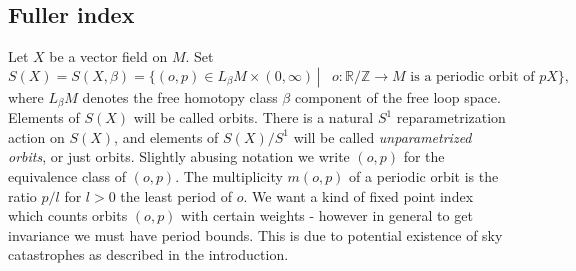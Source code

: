 \documentclass{amsart}
\numberwithin{equation}{section}
\theoremstyle{definition}
\theoremstyle{remark}
\begin{document}
\begin {appendices} 
\section {Fuller index} \label{appendix:Fuller} Let $X$ be a vector field  on $M$. Set \begin{equation*} S (X) = S (X, \beta) = 
   \{(o, p) \in L _{\beta} M \times (0, \infty) \,\left .  \right | \, \text{ $o: \mathbb{R}/\mathbb{Z} \to M $ is a
   periodic orbit of $p X $} \},
\end{equation*}
where $L _{\beta} M  $ denotes
the free homotopy class $\beta$ component of the free loop space.
Elements of $S (X)$ will be called orbits. There
is a natural $S ^{1}$ reparametrization action on $S (X)$, and elements of $S
(X)/S ^{1} $ will be called \emph{unparametrized orbits}, or just orbits. Slightly abusing notation we write $(o,p)$  for
the equivalence class of $(o,p)$. 
%
%
The multiplicity $m (o,p)$ of a periodic orbit is
the ratio $p/l$ for $l>0$ the least  period of $o$.
We want a kind of fixed point index which counts orbits
$(o,p)$ with certain weights - however in general to get
invariance we must
have period bounds. This is due to potential existence of sky catastrophes as
described in the introduction.


\end{appendices}
\end{document}
